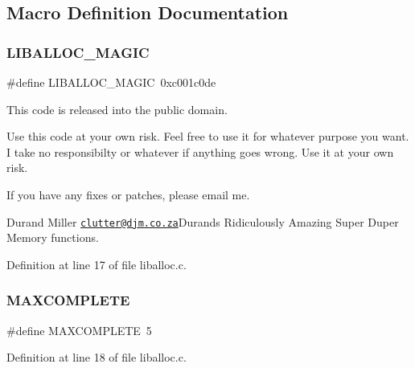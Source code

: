 \subsection{Macro Definition Documentation}
\mbox{\label{a00035_af6b1d459ffa3c81e2456acf8d4268330_af6b1d459ffa3c81e2456acf8d4268330}} 
\subsubsection{\texorpdfstring{L\+I\+B\+A\+L\+L\+O\+C\+\_\+\+M\+A\+G\+IC}{LIBALLOC\_MAGIC}}
{\footnotesize\ttfamily \#define L\+I\+B\+A\+L\+L\+O\+C\+\_\+\+M\+A\+G\+IC~0xc001c0de}



This code is released into the public domain. 

Use this code at your own risk. Feel free to use it for whatever purpose you want. I take no responsibilty or whatever if anything goes wrong. Use it at your own risk.

If you have any fixes or patches, please email me.

Durand Miller \href{mailto:clutter@djm.co.za}{\tt clutter@djm.\+co.\+za}Durand\textquotesingle{}s Ridiculously Amazing Super Duper Memory functions. 

Definition at line 17 of file liballoc.\+c.

\mbox{\label{a00035_a08b7f1e029a0c835f3639557d8ad7a36_a08b7f1e029a0c835f3639557d8ad7a36}} 
\subsubsection{\texorpdfstring{M\+A\+X\+C\+O\+M\+P\+L\+E\+TE}{MAXCOMPLETE}}
{\footnotesize\ttfamily \#define M\+A\+X\+C\+O\+M\+P\+L\+E\+TE~5}



Definition at line 18 of file liballoc.\+c.

\mbox{\label{a00035_af823bb7d083fafbd662be7ea09582013_af823bb7d083fafbd662be7ea09582013}} 
